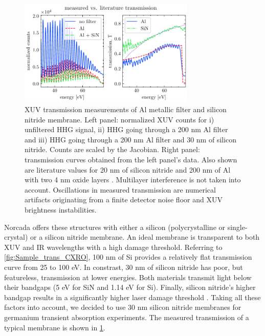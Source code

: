 \begin{figure}
	\centering
	\includegraphics[width=0.75\textwidth]{figures/chap4/SiN_Al_transmission.pdf}
	\caption{XUV transmission measurements of Al metallic filter and silicon nitride membrane. Left panel: normalized XUV counts for i) unfiltered HHG signal, ii) HHG going through a 200 nm Al filter and iii) HHG going through a 200 nm Al filter and 30 nm of silicon nitride. Counts are scaled by the Jacobian. Right panel: transmission curves obtained from the left panel's data. Also shown are literature values for 20 nm of silicon nitride and 200 nm of Al with two 4 nm oxide layers \cite{gulliksonCXROXRayInteractions}. Multilayer interference is not taken into account. Oscillations in measured transmission are numerical artifacts originating from a finite detector noise floor and XUV brightness instabilities.}
	\label{fig:SiN_Al_transmission}
\end{figure}

Norcada offers these structures with either a silicon (polycrystalline or single-crystal) or a silicon nitride membrane. An ideal membrane is transparent to both XUV and IR wavelengths with a high damage threshold. Referring to \cref{fig:Sample_trans_CXRO}, 100 nm of Si provides a relatively flat transmission curve from 25 to 100 eV. In constrast, 30 nm of silicon nitride has poor, but featureless, transmission at lower energies. Both materials transmit light below their bandgaps (5 eV for SiN and 1.14 eV for Si). Finally, silicon nitride's higher bandgap results in a significantly higher laser damage threshold \cite{gamalyAblationSolidsFemtosecond2002,austinFemtosecondLaserDamage2018,keldyshIonizationFieldStrong1965}. Taking all these factors into account, we decided to use 30 nm silicon nitride membranes for germanium transient absorption experiments. The measured transmission of a typical membrane is shown in \cref{fig:SiN_Al_transmission}.

